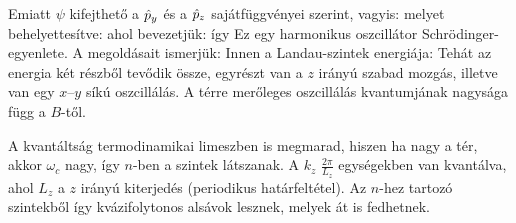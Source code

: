     Emiatt $\psi$ kifejthető a $\hat{p}_y$ és a $\hat{p}_z$ sajátfüggvényei szerint, vagyis:
    melyet behelyettesítve:
    ahol bevezetjük:
    így
    Ez egy harmonikus oszcillátor Schrödinger-egyenlete. A megoldásait ismerjük:
    Innen a Landau-szintek energiája:
    Tehát az energia két részből tevődik össze, egyrészt van a $z$ irányú szabad mozgás, illetve van egy $x$--$y$ síkú oszcillálás. A térre merőleges oszcillálás kvantumjának nagysága függ a $B$-től. 
    
    A kvantáltság termodinamikai limeszben is megmarad, hiszen ha nagy a tér, akkor $\omega_c$ nagy, így $n$-ben a szintek látszanak. A $k_z$ $\frac{2\pi}{L_z}$ egységekben van kvantálva, ahol $L_z$ a $z$ irányú kiterjedés (periodikus határfeltétel). Az $n$-hez tartozó szintekből így kvázifolytonos alsávok lesznek, melyek át is fedhetnek.
    
